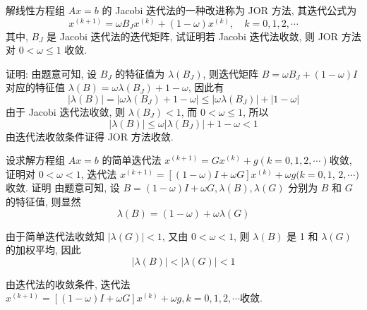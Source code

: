      \begin{tcolorbox}[enhanced,colback=blue!8!white,colframe=blue!25!white,breakable,title=2024]
 解线性方程组 $ A x=b $ 的 Jacobi 迭代法的一种改进称为 JOR 方法, 其迭代公式为
$$
x^{(k+1)}=\omega B_{J} x^{(k)}+(1-\omega) x^{(k)}, \quad k=0,1,2, \cdots
$$
其中, $ B_{J} $ 是 Jacobi 迭代法的迭代矩阵, 试证明若 Jacobi 迭代法收敛, 则 JOR 方法对 $ 0<\omega \leqslant 1 $ 收敛.
 \tcblower

证明: 由题意可知, 设 $ B_{J} $ 的特征值为 $ \lambda\left(B_{J}\right) $, 则迭代矩阵 $ B=\omega B_{J}+(1-\omega) I $对应的特征值 $ \lambda(B)=\omega \lambda\left(B_{J}\right)+1-\omega $, 因此有
$$
|\lambda(B)|=\left|\omega \lambda\left(B_{J}\right)+1-\omega\right| \leqslant\left|\omega \lambda\left(B_{J}\right)\right|+|1-\omega|
$$
由于 Jacobi 迭代法收敛, 则 $ \lambda\left(B_{J}\right)<1 $, 而 $ 0<\omega \leqslant 1 $, 所以
$$
|\lambda(B)| \leqslant \omega\left|\lambda\left(B_{J}\right)\right|+1-\omega<1
$$
由迭代法收敛条件证得 JOR 方法收敛.
 \end{tcolorbox}


      \begin{tcolorbox}[enhanced,colback=blue!8!white,colframe=blue!25!white,breakable,title=2024]
 设求解方程组 $ A x=b $ 的简单迭代法 $ x^{(k+1)}=G x^{(k)}+g(k=0,1,2, \cdots) $收敛, 证明对 $ 0<\omega<1 $, 迭代法 $ x^{(k+1)}=[(1-\omega) I+\omega G] x^{(k)}+\omega g(k=0,1 $, $ 2, \cdots) $ 收敛.
 \tcblower
证明 由题意可知, 设 $ B=(1-\omega) I+\omega G, \lambda(B), \lambda(G) $ 分别为 $ B $ 和 $ G $ 的特征值, 则显然
$$
\lambda(B)=(1-\omega)+\omega \lambda(G)
$$

由于简单迭代法收敛知 $ |\lambda(G)|<1 $, 又由 $ 0<\omega<1 $, 则 $ \lambda(B) $ 是 1 和 $ \lambda(G) $ 的加权平均, 因此
$$
|\lambda(B)|<|\lambda(G)|<1
$$

由迭代法的收敛条件, 迭代法 $ x^{(k+1)}=[(1-\omega) I+\omega G] x^{(k)}+\omega g, k=0,1,2, \cdots $收敛.

 \end{tcolorbox}




